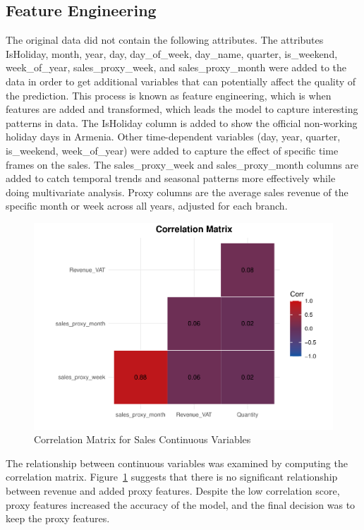 \documentclass[conference]{IEEEtran}
\begin{document}
\subsection{Feature Engineering}
The original data did not contain the following attributes. The attributes IsHoliday, month, year, day, day\_of\_week, day\_name, quarter, is\_weekend, week\_of\_year, sales\_proxy\_week, and sales\_proxy\_month were added to the data in order to get additional variables that can potentially affect the quality of the prediction. This process is known as feature engineering, which is when features are added and transformed, which leads the model to capture interesting patterns in data. The IsHoliday column is added to show the official non-working holiday days in Armenia. Other time-dependent variables (day, year, quarter, is\_weekend, week\_of\_year) were added to capture the effect of specific time frames on the sales. The sales\_proxy\_week and sales\_proxy\_month columns are added to catch temporal trends and seasonal patterns more effectively while doing multivariate analysis. Proxy columns are the average sales revenue of the specific month or week across all years, adjusted for each branch.


\begin{figure}[htbp]
\centering
\includegraphics[width=\columnwidth,keepaspectratio]{./figures/correlation_matrix_with_style.pdf}
\caption{ Correlation Matrix for Sales Continuous Variables \cite{correlation}}
\label{fig:correlationMatrix}
\end{figure}
The relationship between continuous variables was examined by computing the correlation matrix. Figure~\ref{fig:correlationMatrix} suggests that there is no significant relationship between revenue and added proxy features. Despite the low correlation score, proxy features increased the accuracy of the model, and the final decision was to keep the proxy features. 
\end{document}
